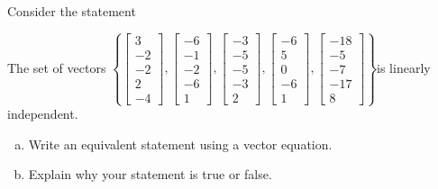 
\begin{exerciseStatement}


Consider the statement 
\begin{center}\begin{minipage}{0.8\textwidth}
 The set of vectors \( \left\{ \left[\begin{array}{c}
3 \\
-2 \\
-2 \\
2 \\
-4
\end{array}\right] , \left[\begin{array}{c}
-6 \\
-1 \\
-2 \\
-6 \\
1
\end{array}\right] , \left[\begin{array}{c}
-3 \\
-5 \\
-5 \\
-3 \\
2
\end{array}\right] , \left[\begin{array}{c}
-6 \\
5 \\
0 \\
-6 \\
1
\end{array}\right] , \left[\begin{array}{c}
-18 \\
-5 \\
-7 \\
-17 \\
8
\end{array}\right] \right\} \)is linearly independent.
\end{minipage}\end{center}
    


\begin{enumerate}[(a)]
\item  Write an equivalent statement using a vector equation.
\item  Explain why your statement is true or false.
\end{enumerate}
    
\end{exerciseStatement}
    
